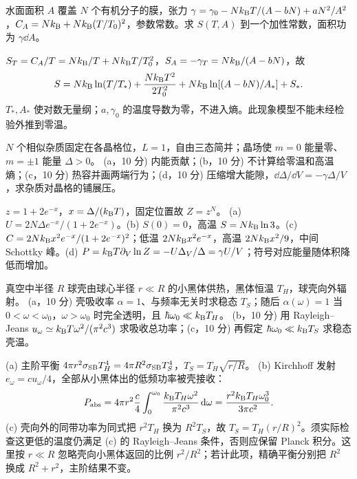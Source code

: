 \begin{exercise}
水面面积 $A$ 覆盖 $N$ 个有机分子的膜，张力 $\gamma=\gamma_0-Nk_{\mathrm B} T/(A-bN)+aN^2/A^2$，$C_A=Nk_{\mathrm B}+Nk_{\mathrm B}(T/T_0)^2$，参数常数。求 $S(T,A)$ 到一个加性常数，面积功为 $\gamma\dd A$。
\end{exercise}
\begin{solution}
$S_T=C_A/T=Nk_{\mathrm B}/T+Nk_{\mathrm B} T/T_0^2$，$S_A=-\gamma_T=Nk_{\mathrm B}/(A-bN)$，故
\[S=Nk_{\mathrm B}\ln(T/T_*)+\frac{Nk_{\mathrm B} T^2}{2T_0^2}+Nk_{\mathrm B}\ln[(A-bN)/A_*]+S_* .\]
$T_*,A_*$ 使对数无量纲；$a,\gamma_0$ 的温度导数为零，不进入熵。此现象模型不能未经检验外推到零温。
\end{solution}
\begin{exercise}
$N$ 个相似杂质固定在各晶格位，$L=1$，自由三态简并；晶场使 $m=0$ 能量零、$m=\pm1$ 能量 $\Delta>0$。
(a，10 分) 内能贡献；(b，10 分) 不计算给零温和高温熵；(c，10 分) 热容并画两端行为；(d，10 分) 压缩增大能隙，$\dd\Delta/\dd V=-\gamma\Delta/V$，求杂质对晶格的铺展压。
\end{exercise}
\begin{solution}
$z=1+2e^{-x}$，$x=\Delta/(k_{\mathrm B} T)$，固定位置故 $Z=z^N$。
(a) $U=2N\Delta e^{-x}/(1+2e^{-x})$。(b) $S(0)=0$，高温 $S=Nk_{\mathrm B}\ln3$。(c) $C=2Nk_{\mathrm B} x^2e^{-x}/(1+2e^{-x})^2$；低温 $2Nk_{\mathrm B} x^2e^{-x}$，高温 $2Nk_{\mathrm B} x^2/9$，中间 Schottky 峰。(d) $P=k_{\mathrm B} T\partial_V\ln Z=-U\Delta_V/\Delta=\gamma U/V$；符号对应能量随体积降低而增加。
\end{solution}
\begin{center}\end{center}
\begin{exercise}
真空中半径 $R$ 球壳由球心半径 $r\ll R$ 的小黑体供热，黑体恒温 $T_H$，球壳向外辐射。
(a，10 分) 壳吸收率 $\alpha=1$、与频率无关时求稳态 $T_S$；随后 $\alpha(\omega)=1$ 当 $0<\omega<\omega_0$，$\omega>\omega_0$ 时完全透明，且 $\hbar\omega_0\ll k_{\mathrm B} T_H$。
(b，10 分) 用 Rayleigh--Jeans $u_\omega\simeq k_{\mathrm B} T\omega^2/(\pi^2c^3)$ 求吸收总功率；(c，10 分) 再假定 $\hbar\omega_0\ll k_{\mathrm B} T_S$ 求稳态壳温。
\end{exercise}
\begin{solution}
(a) 主阶平衡 $4\pi r^2\sigma_{\rm SB}T_H^4=4\pi R^2\sigma_{\rm SB}T_S^4$，$T_S=T_H\sqrt{r/R}$。
(b) Kirchhoff 发射 $e_\omega=cu_\omega/4$，全部从小黑体出的低频功率被壳接收：
\[P_{\rm abs}=4\pi r^2\frac c4\int_0^{\omega_0}\frac{k_{\mathrm B} T_H\omega^2}{\pi^2c^3}\,\mathrm d\omega=\frac{r^2k_{\mathrm B} T_H\omega_0^3}{3\pi c^2}.\]
(c) 壳向外的同带功率为同式把 $r^2T_H$ 换为 $R^2T_S$，故 $T_S=T_H(r/R)^2$。须实际检查这更低的温度仍满足 (c) 的 Rayleigh--Jeans 条件，否则应保留 Planck 积分。这里按 $r\ll R$ 忽略壳向小黑体返回的比例 $r^2/R^2$；若计此项，精确平衡分别把 $R^2$ 换成 $R^2+r^2$，主阶结果不变。
\end{solution}
